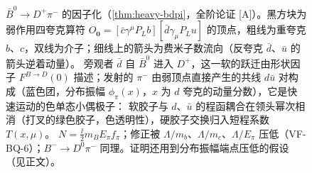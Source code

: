 \begin{figure}[htbp]
\caption{$\bar B^0\to D^+\pi^-$ 的因子化（\cref{thm:heavy-bdpi}，全阶论证 [A]）。黑方块为弱作用四夸克算符 $O_{\mathbf 0}=[\bar c\gamma^\mu P_Lb][\bar d\gamma_\mu P_Lu]$ 的顶点，粗线为重夸克 $b$、$c$，双线为介子；细线上的箭头为费米子数流向（反夸克 $\bar d$、$\bar u$ 的箭头逆着动量）。
旁观者 $\bar d$ 自 $\bar B^0$ 进入 $D^+$，这一软的跃迁由形状因子 $F^{B\to D}(0)$ 描述；发射的 $\pi^-$ 由弱顶点直接产生的共线 $d\bar u$ 对构成（蓝色团，分布振幅 $\phi_\pi(x)$，$x$ 为 $d$ 夸克的动量分数），它是快速运动的色单态小偶极子：
软胶子与 $d$、$\bar u$ 的程函耦合在领头幂次相消（打叉的绿色胶子，色透明性），硬胶子交换归入短程系数 $T(x,\mu)$。
$N=\frac{\ii}{2}m_BE_\pi f_\pi$；修正被 $\Lambda/m_b$、$\Lambda/m_c$、$\Lambda/E_\pi$ 压低（VF-BQ-6）；$B^-\to D^0\pi^-$ 同理。证明还用到分布振幅端点压低的假设（见正文）。}
\label{fig:heavy-bdpi}
\end{figure}
